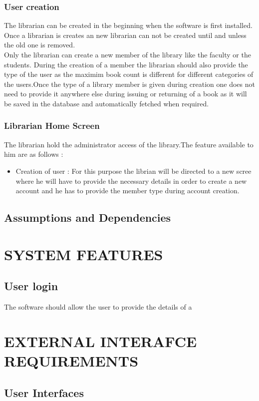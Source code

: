 \documentclass{article}
\begin{document}
\subsubsection*{User creation}
The librarian can be created in the beginning when the software is first installed. Once a librarian is creates an new librarian can not be created until and unless the old one is removed.
\\
Only the librarian can create a new member of the library like the faculty or the students.
During the creation of a member the librarian should also provide the type of the user as the maximim book count is different for different categories of the users.Once the type of a library member is given during creation one does not need to provide it anywhere else during issuing or returning of a book as it will be saved in the database and automatically fetched when required.

\subsubsection*{Librarian Home Screen}
The librarian hold the administrator access of the library.The feature available to him are as follows :
\begin{itemize}
\item Creation of user :
For this purpose the librian will be directed to a new scree where he will have to provide the necessary details in order to create a new account and he has to provide the member type during account creation.
\end{itemize}

\subsection{Assumptions and Dependencies}


\section{SYSTEM FEATURES}
\subsection{User login}
The software should allow the user to provide the details of a 
\section{EXTERNAL INTERAFCE REQUIREMENTS}
\subsection{User Interfaces}
\end{document}
